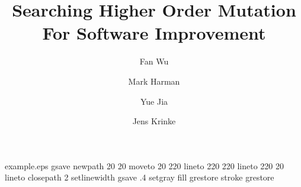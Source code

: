 %
%
%
%
%
\begin{filecontents*}{example.eps}
gsave
newpath
  20 20 moveto
  20 220 lineto
  220 220 lineto
  220 20 lineto
closepath
2 setlinewidth
gsave
  .4 setgray fill
grestore
stroke
grestore
\end{filecontents*}
%
\RequirePackage{fix-cm}
%
\documentclass[smallextended]{svjour3}       %
%
\smartqed  %
%
\usepackage{graphicx}
%
%
%
%
%


\title{Searching Higher Order Mutation For Software Improvement}


\author{Fan Wu         \and
		Mark Harman         \and
		Yue Jia         \and
		Jens Krinke
}



